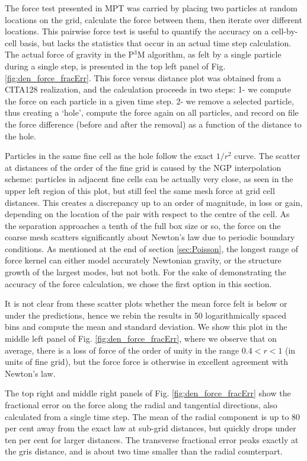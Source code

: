 The force test presented in MPT was carried by placing two particles at random locations on the grid, calculate the force between them, then iterate
over different locations. This pairwise force test is useful to quantify the accuracy on a cell-by-cell basis, but lacks the statistics that occur in an actual time step calculation.  
The actual force of gravity in the P$^3$M algorithm,
as felt by a single particle during a single step, is presented in the top left panel of Fig. \ref{fig:den_force_fracErr}.
This force versus distance plot was obtained from a CITA128 realization, and the calculation proceeds in two steps: 
1- we compute the force on each particle in a given time step.
2- we remove a selected particle, thus creating a `hole', compute the force again on all particles, and record on file the 
force difference (before  and after the removal) as a function of the distance to the hole.

Particles in the same fine cell as the hole follow the exact $1/r^{2}$ curve. The scatter at 
  distances of the order of the fine grid is caused by the NGP interpolation scheme:
  particles in adjacent fine cells can be actually very close, as seen in the upper left region of this plot,
  but still feel the same mesh force at grid cell distances.
This  creates a discrepancy up to an order of magnitude, in loss or gain, depending on the location of the pair with respect to the centre of the cell.
As the separation approaches a tenth of the full box size or so, the force on the coarse mesh 
scatters significantly about Newton's law due to periodic boundary conditions. 
As mentioned at the end of section \ref{sec:Poisson}, the longest range of force kernel can either model accurately Newtonian gravity,
or the structure growth of the largest modes, but not both. For the sake of demonstrating the accuracy of the force calculation,
we chose the first option in this section.

It is not clear from these scatter plots whether the mean force felt  is below or under the predictions, hence we rebin the results
in 50 logarithmically spaced bins and compute the mean and standard deviation. 
We show this plot in the middle left panel of Fig. \ref{fig:den_force_fracErr}, where we observe that on average,
there is a loss of force of the order of unity in the range $ 0.4 < r < 1$ (in units of fine grid), but the force force is otherwise
in excellent agreement with Newton's law.


The top right and middle right panels of Fig. \ref{fig:den_force_fracErr} show the fractional error on the force along the radial and tangential directions, also calculated from a single time step.
The mean of the radial component is up to 80 per cent away from the exact law at sub-grid distances, but quickly drops under ten per cent for larger distances. 
The transverse fractional error peaks exactly at the gris distance,  and is about two time smaller than the radial counterpart.

